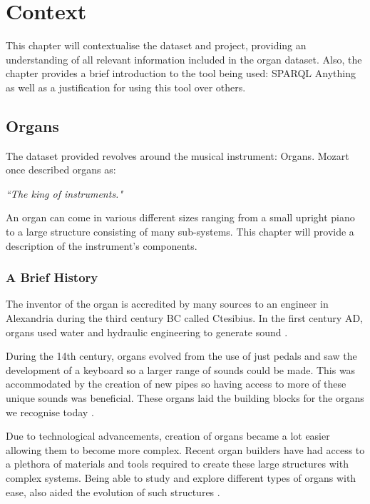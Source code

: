 \chapter{Context}
This chapter will contextualise the dataset and project, providing an understanding of all relevant information included in the organ dataset. Also, the chapter provides a brief introduction to the tool being used: SPARQL Anything as well as a justification for using this tool over others. 

\section{Organs}
\hspace{0.5cm} The dataset provided revolves around the musical instrument: Organs. Mozart once described organs as:

\vspace{-0.15cm}
\begin{displayquote}
    \textit{``The king of instruments."}
\end{displayquote}
\vspace{-0.15cm}

An organ can come in various different sizes ranging from a small upright piano to a large structure consisting of many sub-systems. This chapter will provide a description of the instrument's components.

\subsection{A Brief History}
\hspace{0.5cm} 
The inventor of the organ is accredited by many sources to an engineer in Alexandria during the third century BC called Ctesibius. In the first century AD, organs used water and hydraulic engineering to generate sound \cite{organhistory}.

During the 14th century, organs evolved from the use of just pedals and saw the development of a keyboard so a larger range of sounds could be made. This was accommodated by the creation of new pipes so having access to more of these unique sounds was beneficial. These organs laid the building blocks for the organs we recognise today \cite{organmedivalhistory}.

Due to technological advancements, creation of organs became a lot easier allowing them to become more complex. Recent organ builders have had access to a plethora of materials and tools required to create these large structures with complex systems. Being able to study and explore different types of organs with ease, also aided the evolution of such structures \cite{organhistory1}.

